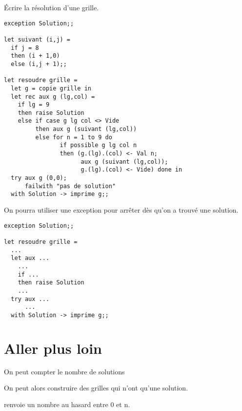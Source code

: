 \begin{Exercise}\'Ecrire la résolution d'une grille.
\end{Exercise}
\begin{Answer}
\begin{lstlisting}
exception Solution;;

let suivant (i,j) =
  if j = 8
  then (i + 1,0)
  else (i,j + 1);;

let resoudre grille = 
  let g = copie grille in
  let rec aux g (lg,col) = 
    if lg = 9
    then raise Solution
    else if case g lg col <> Vide
         then aux g (suivant (lg,col))
         else for n = 1 to 9 do
                if possible g lg col n
                then (g.(lg).(col) <- Val n;
                      aux g (suivant (lg,col));
                      g.(lg).(col) <- Vide) done in
  try aux g (0,0);
      failwith "pas de solution"
  with Solution -> imprime g;;
\end{lstlisting} 
\end{Answer}
On pourra utiliser une exception pour arrêter dès qu'on a trouvé une solution.
\begin{lstlisting}
exception Solution;;

let resoudre grille =
  ...
  let aux ...
    ...
    if ... 
    then raise Solution
    ...
  try aux ...
      ...
  with Solution -> imprime g;;
\end{lstlisting} 
\section{Aller plus loin}
On peut compter le nombre de solutions

On peut alors construire des grilles qui n'ont qu'une solution.

  renvoie un nombre au hasard entre 0 et n.
